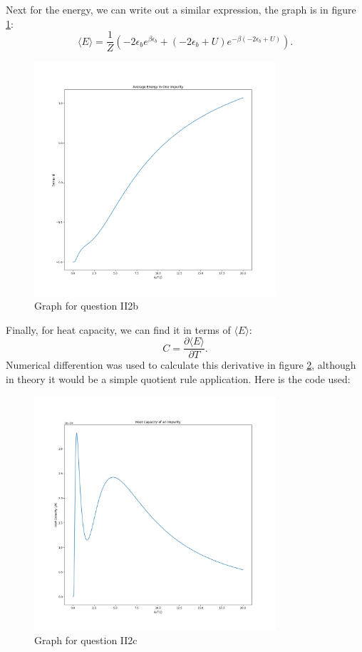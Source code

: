 \documentclass[letterpaper, reqno,11pt]{article}
\begin{document}
Next for the energy, we can write out a similar expression, the graph is in figure \ref{fig:II2b}:
\[
\langle E \rangle =\frac{1}{Z}\left( -2\epsilon_b e^{\beta \epsilon_b}+(-2\epsilon_b+U)e^{-\beta(-2\epsilon_b+U)} \right) 
.\]

\begin{figure}[htpb]
    \centering
    \includegraphics[width=0.8\textwidth]{II2b}
    \caption{Graph for question II2b}
    \label{fig:II2b}
\end{figure}

Finally, for heat capacity, we can find it in terms of $\langle E \rangle $:
\[
C = \frac{\partial \langle E \rangle }{\partial T}
.\]
Numerical differention was used to calculate this derivative in figure \ref{fig:II2c}, although in theory it would be a simple quotient rule application. Here is the code used:

\begin{figure}[htpb]
    \centering
    \includegraphics[width=0.8\textwidth]{II2C}
    \caption{Graph for question II2c}
    \label{fig:II2c}
\end{figure}
\end{document}
